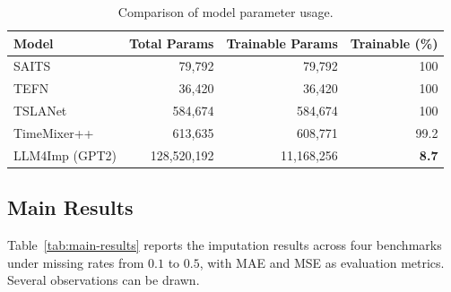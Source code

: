 \documentclass[conference]{IEEEtran}
\begin{document}
\begin{table}[!ht]
\centering
\caption{Comparison of model parameter usage.}
\label{tab:params}
\begin{tabular}{lrrr}
\toprule
Model & Total Params & Trainable Params & Trainable (\%) \\
\midrule
SAITS        & 79,792        & 79,792        & 100 \\
TEFN         & 36,420        & 36,420        & 100 \\
TSLANet      & 584,674       & 584,674       & 100 \\
TimeMixer++  & 613,635       & 608,771       & 99.2 \\
LLM4Imp (GPT2) & 128,520,192   & 11,168,256    & \textbf{8.7} \\
\bottomrule
\end{tabular}
\vspace{-0.5cm}
\end{table}

\subsection{Main Results}
\label{subsec:main-results}
Table~\ref{tab:main-results} reports the imputation results across four benchmarks under missing rates from $0.1$ to $0.5$, with MAE and MSE as evaluation metrics. Several observations can be drawn.
\end{document}

